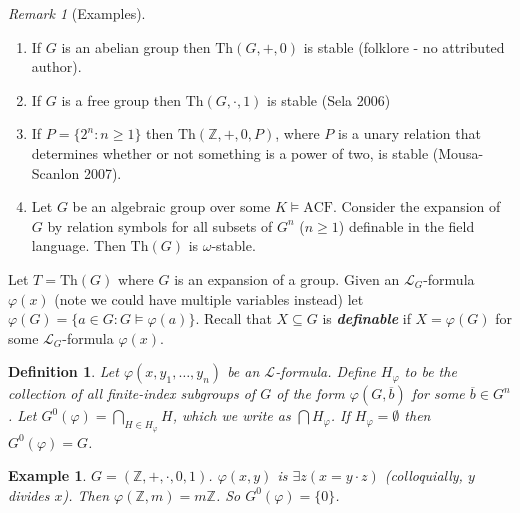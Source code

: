 \documentclass[]{article}
\theoremstyle{custhm}
\theoremstyle{cusdef}
\newtheorem{defin}[theorem]{Definition}
\theoremstyle{custhm}
\theoremstyle{custhm}
\theoremstyle{custhm}
\theoremstyle{ex}
\newtheorem{ex}[theorem]{Example}
\theoremstyle{custhm}
\theoremstyle{cusdef}
\theoremstyle{remark}
\newtheorem*{remark*}{Remark}
\theoremstyle{remark}
\theoremstyle{numremark}
\newcommand{\Z}{\mathbb{Z}}
\newcommand{\undf}[1]{\textit{\textbf{#1}}}
\renewcommand{\L}{\mathcal{L}}
\renewcommand{\phi}{\varphi}
\renewcommand{\bar}{\overline}
\newcommand{\Th}{\textrm{Th}}
\newcommand{\acf}{\textrm{ACF}}
\begin{document}
\begin{remark*}[Examples]\ 
	\begin{enumerate}
		\item If $G$ is an abelian group then $\Th(G,+,0)$ is stable (folklore - no attributed author).
		\item If $G$ is a free group then $\Th(G,\cdot,1)$ is stable (Sela 2006)
		\item If $P = \{2^n:n\ge 1\}$ then $\Th(\Z,+,0,P)$, where $P$ is a unary relation that determines whether or not something is a power of two, is stable (Mousa-Scanlon 2007).
		\item Let $G$ be an algebraic group over some $K\models \acf$. Consider the expansion of $G$ by relation symbols for all subsets of $G^n$ ($n\ge 1$) definable in the field language. Then $\Th(G)$ is $\omega$-stable.
	\end{enumerate}
\end{remark*}

Let $T = \Th(G)$ where $G$ is an expansion of a group. Given an $\L_G$-formula $\phi(x)$ (note we could have multiple variables instead) let $\phi(G) = \{a\in G:G\models \phi(a)\}$. Recall that $X\subseteq G$ is \undf{definable} if $X = \phi(G)$ for some $\L_G$-formula $\phi(x)$.

\begin{defin}
	Let $\phi(x,y_1,\dots,y_n)$ be an $\L$-formula. Define $H_\phi$ to be the collection of all finite-index subgroups of $G$ of the form $\phi(G,\bar{b})$ for some $\bar{b}\in G^n$. Let $G^{0}(\phi) = \bigcap_{H\in H_{\phi}}H$, which we write as $\bigcap H_\phi$. If $H_\phi = \emptyset$ then $G^{0}(\phi) = G$.
\end{defin}

\begin{ex}
	$G = (\Z,+,\cdot,0,1)$. $\phi(x,y)$ is $\exists z(x=y\cdot z)$ (colloquially, $y$ divides $x$). Then $\phi(\Z,m) = m\Z$. So $G^{0}(\phi) = \{0\}$.
\end{ex}
\end{document}
